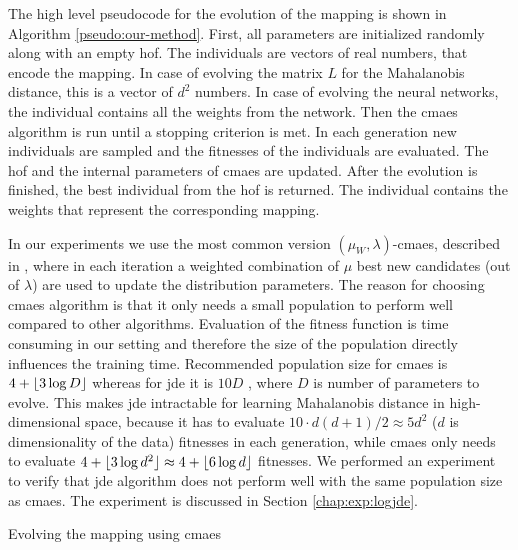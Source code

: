 \documentclass[12pt,a4paper]{report}
\begin{document}
The high level pseudocode for the evolution of the mapping is shown in Algorithm \ref{pseudo:our-method}. First, all parameters are initialized randomly along with an empty \ac{hof}. The individuals are vectors of real numbers, that encode the mapping. In case of evolving the matrix $L$ for the Mahalanobis distance, this is a vector of $d^2$ numbers. In case of evolving the neural networks, the individual contains all the weights from the network. Then the \ac{cmaes} algorithm is run until a stopping criterion is met. In each generation new individuals are sampled and the fitnesses of the individuals are evaluated. The \ac{hof} and the internal parameters of \ac{cmaes} are updated. After the evolution is finished, the best individual from the \ac{hof} is returned. The individual contains the weights that represent the corresponding mapping.

In our experiments we use the most common version $(\mu_W, \lambda)$-\ac{cmaes}, described in \cite{hansen2001completely}, where in each iteration a weighted combination of $\mu$ best new candidates (out of $\lambda$) are used to update the distribution parameters. The reason for choosing \ac{cmaes} algorithm is that it only needs a small population to perform well compared to other algorithms. Evaluation of the fitness function is time consuming in our setting and therefore the size of the population directly influences the training time. Recommended population size for \ac{cmaes} is $4+\lfloor3\log{D}\rfloor$ \citep{hansen2006cma} whereas for \ac{jde} it is $10D$ \citep{brest2006self}, where $D$ is number of parameters to evolve. This makes \ac{jde} intractable for learning Mahalanobis distance in high-dimensional space, because it has to evaluate $10\cdot d(d+1)/2 \approx 5d^2$ ($d$ is dimensionality of the data) fitnesses in each generation, while \ac{cmaes} only needs to evaluate $4+\lfloor3\log{d^2}\rfloor \approx 4+\lfloor6\log{d}\rfloor$ fitnesses. We performed an experiment to verify that \ac{jde} algorithm does not perform well with the same population size as \ac{cmaes}. The experiment is discussed in Section \ref{chap:exp:logjde}.

\begin{algorithm}[t]
\caption{Evolving the mapping using \ac{cmaes}} \label{pseudo:our-method}
\DontPrintSemicolon
\LinesNumbered
{}
\end{algorithm} 
\end{document}
